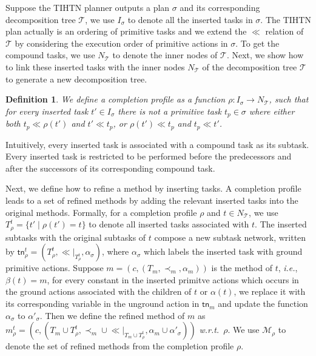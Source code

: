 \documentclass[letterpaper]{article} %
\newtheorem{definition}{Definition}
\newcommand{\Methods}{\mathcal{M}}
\newcommand{\tn}{\mathsf{tn}}
\newcommand{\plan}{\sigma}
\newcommand{\Dtree}{\mathcal{T}}
\newcommand{\innernodes}{N_\Dtree}
\newcommand{\insertTask}{t'}
\newcommand{\primTask}{t_p}
\newcommand{\aspprec}{\ll}
\newcommand{\insertActions}{I}
\newcommand{\improveFunction}{\rho}
\begin{document}
Suppose the TIHTN planner outputs a plan $\plan$ and its corresponding decomposition tree $\Dtree$, we use $\insertActions_\plan$ to denote all the inserted tasks in $\plan$.
The TIHTN plan actually is an ordering of primitive tasks and we extend the $\aspprec$ relation of $\Dtree$ by considering the execution order of primitive actions in $\plan$.
To get the compound tasks, we use $\innernodes$ to denote the inner nodes of $\Dtree$.
Next, we show how to link these inserted tasks with the inner nodes $\innernodes$ of the decomposition tree $\Dtree$ to generate a new decomposition tree.

\begin{definition}%
\label{def_complete_profile}
We define a completion profile as a function $\improveFunction\! :\! \insertActions_\plan \longrightarrow \innernodes$, such that for every inserted task $\insertTask \in \insertActions_\plan$
there is not a primitive task $\primTask \in \plan$ where either both $\primTask \! \aspprec\!  \improveFunction(\insertTask)$ and $\insertTask \aspprec \primTask$, or $\improveFunction(\insertTask)  \aspprec \primTask$ and $\primTask  \aspprec  \insertTask$.
\end{definition}

Intuitively, every inserted task is associated with a compound task as its subtask.
Every inserted task is restricted to be performed before the predecessors and after the successors of its corresponding compound task. %

Next, we define how to refine a method by inserting tasks.
A completion profile leads to a set of refined methods by adding the relevant inserted tasks into the original methods. %
Formally, for a completion profile $\improveFunction$ and $t\in \innernodes$,%
we use $T_\improveFunction^t \!=\! \{\insertTask \mid\! \improveFunction(\insertTask)\!=\!t\}$ %
to denote all inserted tasks associated with $t$.
The inserted subtasks with the original subtasks of $t$ compose a new subtask network, written by $\tn_\improveFunction^t = (T_\improveFunction^t,{\aspprec}|_{T_\improveFunction^t},\alpha_\plan)$, where $\alpha_\plan$ which labels the inserted task with ground primitive actions.
Suppose $m = (c, (T_m,\prec_m,\alpha_m))$ is the method of $t$, \emph{i.e.}, $\beta(t)=m$,
for every constant in the inserted primitve actions which occurs in the ground actions associated with the children of $t$ or $\alpha(t)$,
we replace it with its corresponding variable in the unground action in $\tn_m$ and update the function $\alpha_\plan$ to $\alpha'_\plan$.
Then we define the refined method of $m$ as $m_\improveFunction^t \!= \! (c, (T_m \cup T_\improveFunction^t, \prec_m \!\cup\! \aspprec\!|_{T_m \cup T_\improveFunction^t}, \alpha_m \cup \alpha'_\plan))$
\emph{w.r.t.}\ $\improveFunction$.
We use $\Methods_{\improveFunction}$ to denote the set of refined methods from the completion profile $\improveFunction$.
\end{document}
